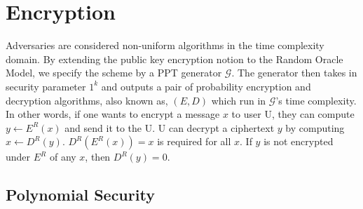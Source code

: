 \documentclass{article}
\begin{document}














\section{Encryption}

Adversaries are considered non-uniform algorithms in the time complexity domain. By extending the public key encryption notion to the Random Oracle Model, we specify the scheme by a PPT generator $\mathcal{G}$.  The generator then takes in security parameter $1^k$ and outputs a pair of probability encryption and decryption algorithms, also known as, $(E, D)$ which run in $\mathcal{G}$’s time complexity. In other words, if one wants to encrypt a message $x$ to user U, they can compute $y \gets E^R(x)$ and send it to the U. U can decrypt a ciphertext $y$ by computing $x \gets D^R(y)$. $D^R(E^R(x)) = x$ is required for all $x$. If $y$ is not encrypted under $E^R$ of any $x$, then $D^R(y) = 0$. 

\subsection{Polynomial Security}
\end{document}
